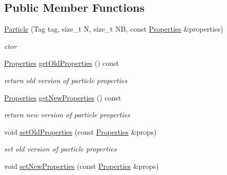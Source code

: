 \subsection*{\-Public \-Member \-Functions}
\begin{DoxyCompactItemize}
\item 
\hypertarget{classParticle_a88358bdce88d9dda12e57c5ff976dca5}{\hyperlink{classParticle_a88358bdce88d9dda12e57c5ff976dca5}{\-Particle} (\-Tag tag, size\-\_\-t \-N, size\-\_\-t \-N\-B, const \hyperlink{structProperties}{\-Properties} \&properties)}\label{classParticle_a88358bdce88d9dda12e57c5ff976dca5}

\begin{DoxyCompactList}\small\item\em ctor \end{DoxyCompactList}\item 
\hypertarget{classParticle_ac2bd006400deb1c9f17ddce9d70d3728}{\hyperlink{structProperties}{\-Properties} \hyperlink{classParticle_ac2bd006400deb1c9f17ddce9d70d3728}{get\-Old\-Properties} () const }\label{classParticle_ac2bd006400deb1c9f17ddce9d70d3728}

\begin{DoxyCompactList}\small\item\em return old version of particle properties \end{DoxyCompactList}\item 
\hypertarget{classParticle_a4dd65686cc2494434cab8db8a2a8e923}{\hyperlink{structProperties}{\-Properties} \hyperlink{classParticle_a4dd65686cc2494434cab8db8a2a8e923}{get\-New\-Properties} () const }\label{classParticle_a4dd65686cc2494434cab8db8a2a8e923}

\begin{DoxyCompactList}\small\item\em return new version of particle properties \end{DoxyCompactList}\item 
\hypertarget{classParticle_a0b1b6f1166d06dbe1ab143c6561bb9cc}{void \hyperlink{classParticle_a0b1b6f1166d06dbe1ab143c6561bb9cc}{set\-Old\-Properties} (const \hyperlink{structProperties}{\-Properties} \&props)}\label{classParticle_a0b1b6f1166d06dbe1ab143c6561bb9cc}

\begin{DoxyCompactList}\small\item\em set old version of particle properties \end{DoxyCompactList}\item 
\hypertarget{classParticle_afea2eefc83b471a45c9b1e6c442b91c6}{void \hyperlink{classParticle_afea2eefc83b471a45c9b1e6c442b91c6}{set\-New\-Properties} (const \hyperlink{structProperties}{\-Properties} \&props)}\label{classParticle_afea2eefc83b471a45c9b1e6c442b91c6}


\end{DoxyCompactItemize}
